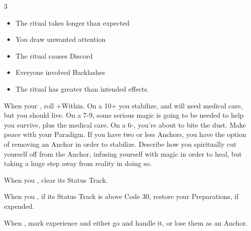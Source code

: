 \begin{multicols}{3}
\begin{move}
    \begin{itemize}
      \setlength\itemsep{0em}
    \item The ritual takes longer than expected
    \item You draw unwanted attention
    \item The ritual causes Discord
    \item Everyone involved Backlashes
    \item The ritual has greater than intended effects.
    \end{itemize}

  \end{move}

  \SEPARATOR

  \begin{move}
    When your , roll +Within. On a 10+ you stabilize, and will need medical care, but you should live. On a 7-9, some serious magic is going to be needed to help you survive, plus the medical care. On a 6-, you’re about to bite the dust. Make peace with your Paradigm. If you have two or less Anchors, you have the option of removing an Anchor in order to stabilize. Describe how you spiritually cut yourself off from the Anchor, infusing yourself with magic in order to heal, but taking a huge step away from reality in doing so.

  \end{move}

  \columnbreak

  \begin{move}
    When you , clear its Status Track.

  \end{move}

  \SEPARATOR

  \vspace{-.1in}
  
  \begin{move}
    When you , if its Status Track is above Code 30, restore your Preparations, if expended.

  \end{move}

  \SEPARATOR

  \vspace{-.1in}

  \begin{move}
    When , mark experience and either go and handle it, or lose them as an Anchor.


\end{move}
\end{multicols}
